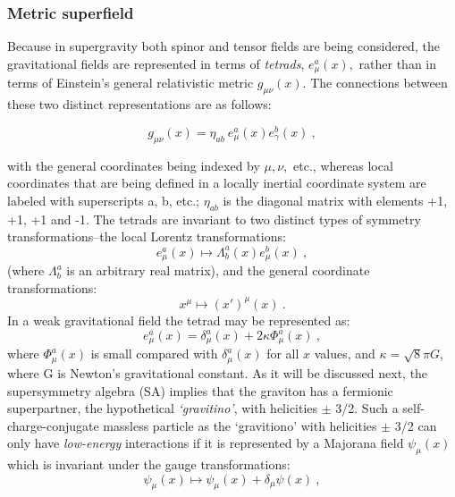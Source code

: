 \documentclass[12pt]{article}
\theoremstyle{plain}
\theoremstyle{definition}
\numberwithin{equation}{section}
\newcommand{\<}{{\langle}}
\begin{document}
\subsubsection{Metric superfield}

Because in supergravity both spinor and tensor fields are being
considered, the gravitational fields are represented in terms of
\emph{tetrads}, $e^a_\mu(x),$ rather than in terms of Einstein's general
relativistic metric $g_{\mu \nu}(x)$. The connections between
these two distinct representations are as follows:

\begin{equation}
g_{\mu\nu}(x) = \eta_{ab}~ e^a_\mu (x)e^b_\gamma(x)~,
\end{equation}

with the general coordinates being indexed by $\mu,\nu,$ etc.,
whereas local coordinates that are being defined in a locally
inertial coordinate system are labeled with superscripts a, b,
etc.;   $ \eta_{ab}$ is the diagonal matrix with elements +1, +1,
+1 and -1. The tetrads are invariant to two distinct types of
symmetry transformations--the local Lorentz transformations:
\begin{equation}
e^a_\mu (x)\longmapsto \Lambda^a_b (x) e^b_\mu (x)~,
\end{equation}
(where $\Lambda^a_b$ is an arbitrary real matrix), and the general
coordinate transformations:
\begin{equation}
x^\mu \longmapsto (x')^\mu(x) ~.
\end{equation}
In a weak gravitational field the tetrad may be represented as:
\begin{equation}
e^a_\mu (x)=\delta^a_\mu(x)+ 2\kappa \Phi^a_\mu (x)~,
\end{equation}
where $\Phi^a_\mu(x)$ is small compared with $\delta^a_\mu(x)$ for
all $x$ values, and $\kappa= \surd 8\pi G$, where G is Newton's
gravitational constant. As it will be discussed next, the
supersymmetry algebra (SA) implies that the graviton has a
fermionic superpartner, the hypothetical \emph{`gravitino'}, with
helicities $\pm$ 3/2. Such a self-charge-conjugate massless
particle as the `gravitiono' with helicities $\pm$ 3/2 can only have
\emph{low-energy} interactions if it is represented by a Majorana
field $\psi _\mu(x)$ which is invariant under the gauge
transformations:
\begin{equation}
\psi _\mu(x)\longmapsto \psi _\mu(x)+\delta _\mu \psi(x) ~,
\end{equation}
\end{document}
